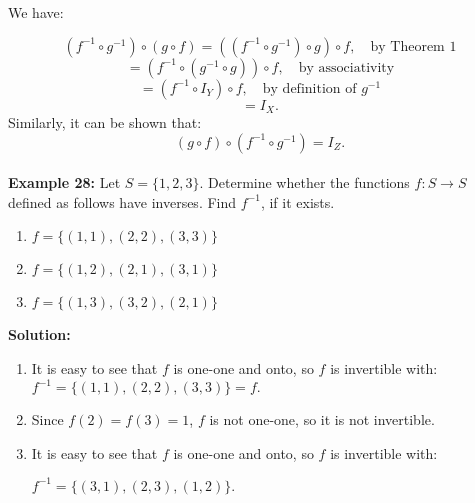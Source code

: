 \documentclass[12pt]{article}
\begin{document}
We have:

\[
(f^{-1} \circ g^{-1}) \circ (g \circ f) = ((f^{-1} \circ g^{-1}) \circ g) \circ f, \quad \text{by Theorem 1}
\]
\[
= (f^{-1} \circ (g^{-1} \circ g)) \circ f, \quad \text{by associativity}
\]
	\[
= (f^{-1} \circ I_Y) \circ f, \quad \text{by definition of } g^{-1}
\]
\[
= I_X.
\]
Similarly, it can be shown that:\[(g \circ f) \circ (f^{-1} \circ g^{-1}) = I_Z.\]
\\
\textbf{Example 28:}  
Let \( S = \{1, 2, 3\} \). Determine whether the functions \( f: S \to S \) defined as follows have inverses. Find \( f^{-1} \), if it exists.
\\
\begin{enumerate}
    \renewcommand{\labelenumi}{\alph{enumi})}
    \item \( f = \{(1,1), (2,2), (3,3)\} \)
    \item \( f = \{(1,2), (2,1), (3,1)\} \)
    \item \( f = \{(1,3), (3,2), (2,1)\} \)
\end{enumerate}


\textbf{Solution:}

\begin{enumerate}
    \renewcommand{\labelenumi}{\alph{enumi})}

    \item It is easy to see that \( f \) is one-one and onto, so \( f \) is invertible with: \(
    f^{-1} = \{(1,1), (2,2), (3,3)\} = f.
    \)

    \item Since \( f(2) = f(3) = 1 \), \( f \) is not one-one, so it is not invertible.

    \item It is easy to see that \( f \) is one-one and onto, so \( f \) is invertible with:

    \(
    f^{-1} = \{(3,1), (2,3), (1,2)\}.
    \)
\end{enumerate}
\end{document}
